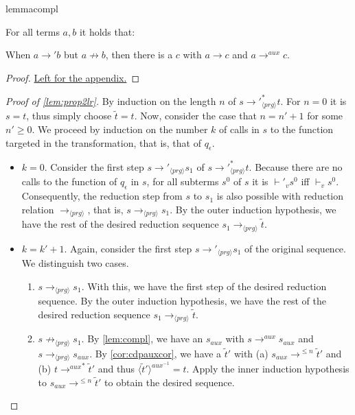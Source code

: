 \begin{restatable}[Complementarity]{lemma}{compl}
\label{lem:compl}

For all terms $a,b$ it holds that:

When $a \longrightarrow' b$ but $a \not\longrightarrow b$, then there is a $c$ with $a \longrightarrow c$ and $a \longrightarrow^{aux} c$.

\end{restatable}

\begin{proof}
\hyperref[prf:compl]{Left for the appendix.}
\end{proof}

\begin{proof}[Proof of \autoref{lem:prop2lr}]

By induction on the length $n$ of $s {\longrightarrow'}_{\langle prg \rangle}^* t$. For $n = 0$ it is $s = t$, thus simply choose $\widetilde{t} = t$. Now, consider the case that $n = n'+1$ for some $n' \geq 0$. We proceed by induction on the number $k$ of calls in $s$ to the function targeted in the transformation, that is, that of $q_\epsilon$.

\begin{itemize}
\item $k = 0$. Consider the first step $s {\longrightarrow'}_{\langle prg \rangle} s_1$ of $s {\longrightarrow'}_{\langle prg \rangle}^* t$. Because there are no calls to the function of $q_\epsilon$ in $s$, for all subterms $s^0$ of $s$ it is $\vdash'_v s^0$ iff $\vdash_v s^0$. Consequently, the reduction step from $s$ to $s_1$ is also possible with reduction relation $\longrightarrow_{\langle prg \rangle}$, that is, $s \longrightarrow_{\langle prg \rangle} s_1$. By the outer induction hypothesis, we have the rest of the desired reduction sequence $s_1 \longrightarrow_{\langle prg \rangle} \widetilde{t}$.

\item $k = k' + 1$. Again, consider the first step $s {\longrightarrow'}_{\langle prg \rangle} s_1$ of the original sequence. We distinguish two cases.
\begin{enumerate}
\item $s \longrightarrow_{\langle prg \rangle} s_1$. With this, we have the first step of the desired reduction sequence. By the outer induction hypothesis, we have the rest of the desired reduction sequence $s_1 \longrightarrow_{\langle prg \rangle} \widetilde{t}$.

\item $s \not\longrightarrow_{\langle prg \rangle} s_1$. By \autoref{lem:compl}, we have an $s_{aux}$ with $s \longrightarrow^{aux} s_{aux}$ and $s \longrightarrow_{\langle prg \rangle} s_{aux}$. By \autoref{cor:cdpauxcor}, we have a $\widetilde{t}'$ with (a) $s_{aux} \longrightarrow^{\leq n} \widetilde{t}'$ and (b) $t {\longrightarrow^{aux}}^* \widetilde{t}'$ and thus $\langle \widetilde{t}' \rangle^{aux^{-1}} = t$. Apply the inner induction hypothesis to $s_{aux} \longrightarrow^{\leq n} \widetilde{t}'$ to obtain the desired sequence.
\end{enumerate}
\end{itemize}

\end{proof}

